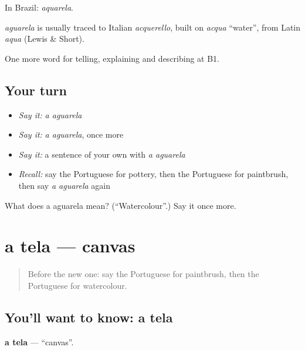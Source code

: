 In Brazil: \emph{aquarela}.

\begin{cousinweb}
\emph{aguarela} is usually traced to Italian \emph{acquerello}, built on \emph{acqua} \textquotedblleft{}water\textquotedblright{}, from Latin \emph{aqua} (Lewis \& Short).
\end{cousinweb}

\begin{grammarlens}[title={What you've built}]
One more word for telling, explaining and describing at B1.
\end{grammarlens}

\subsection*{Your turn}
\begin{itemize}
\raggedright
  \item \emph{Say it:} \emph{a aguarela}
  \item \emph{Say it:} \emph{a aguarela}, once more
  \item \emph{Say it:} a sentence of your own with \emph{a aguarela}
  \item \emph{Recall:} say the Portuguese for pottery, then the Portuguese for paintbrush, then say \emph{a aguarela} again
\end{itemize}

\begin{tcolorbox}[breakable,colback=teal!4,colframe=teal!35!black,title={Before you move on}]
What does a aguarela mean? (\textquotedblleft{}Watercolour\textquotedblright{}.) Say it once more.
\end{tcolorbox}
\section[a tela]{a tela — canvas}

\label{lesson:PT-C505-tela}



\begin{quote}
Before the new one: say the Portuguese for paintbrush, then the Portuguese for watercolour.
\end{quote}

\subsection*{You'll want to know: a tela}
\textbf{a tela} — \textquotedblleft{}canvas\textquotedblright{}.


